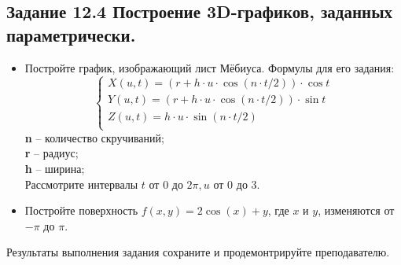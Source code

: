 \subsection*{\textbf{Задание 12.4} Построение 3D-графиков, заданных параметрически.}
\begin{itemize}
    \item Постройте график, изображающий лист Мёбиуса.
    Формулы для его задания:
    \[
        \begin{cases}
            X(u,t) = (r+h\cdot u \cdot \cos(n\cdot t/2))\cdot \cos t \\
            Y(u,t) = (r+h\cdot u \cdot \cos(n\cdot t/2))\cdot \sin t \\
            Z(u,t) = h \cdot u \cdot \sin(n \cdot t/2) \\
        \end{cases}
    \]
    \textbf{n} -- количество скручиваний; \\
    \textbf{r} -- радиус; \\
    \textbf{h} -- ширина; \\
    Рассмотрите интервалы $t$ от $0$ до $2\pi, u$ от $0$ до $3$.
    \item Постройте поверхность $f(x,y) = 2\cos(x) + y$, где $x$ и $y$, изменяются от $-\pi$ до $\pi$.
\end{itemize}
Результаты выполнения задания сохраните и продемонтрируйте преподавателю.

\begin{figure}[H]
    \renewcommand{\figurename}{Рисунок}
    \label{fig:image_12_4_1}
\end{figure}

\begin{figure}[H]
    \renewcommand{\figurename}{Рисунок}
    \label{fig:image_12_4_2}
\end{figure}